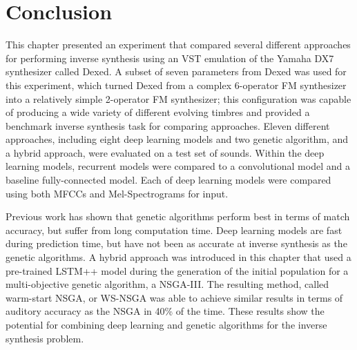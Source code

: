 

\section{Conclusion}
This chapter presented an experiment that compared several different approaches for performing inverse synthesis using an VST emulation of the Yamaha DX7 synthesizer called Dexed. A subset of seven parameters from Dexed was used for this experiment, which turned Dexed from a complex 6-operator FM synthesizer into a relatively simple 2-operator FM synthesizer; this configuration was capable of producing a wide variety of different evolving timbres and provided a benchmark inverse synthesis task for comparing approaches. Eleven different approaches, including eight deep learning models and two genetic algorithm, and a hybrid approach, were evaluated on a test set of sounds. Within the deep learning models, recurrent models were compared to a convolutional model and a baseline fully-connected model. Each of deep learning models were compared using both MFCCs and Mel-Spectrograms for input.

Previous work has shown that genetic algorithms perform best in terms of match accuracy, but suffer from long computation time. Deep learning models are fast during prediction time, but have not been as accurate at inverse synthesis as the genetic algorithms. A hybrid approach was introduced in this chapter that used a pre-trained LSTM++ model during the generation of the initial population for a multi-objective genetic algorithm, a NSGA-III. The resulting method, called warm-start NSGA, or WS-NSGA was able to achieve similar results in terms of auditory accuracy as the NSGA in 40\% of the time. These results show the potential for combining deep learning and genetic algorithms for the inverse synthesis problem.



